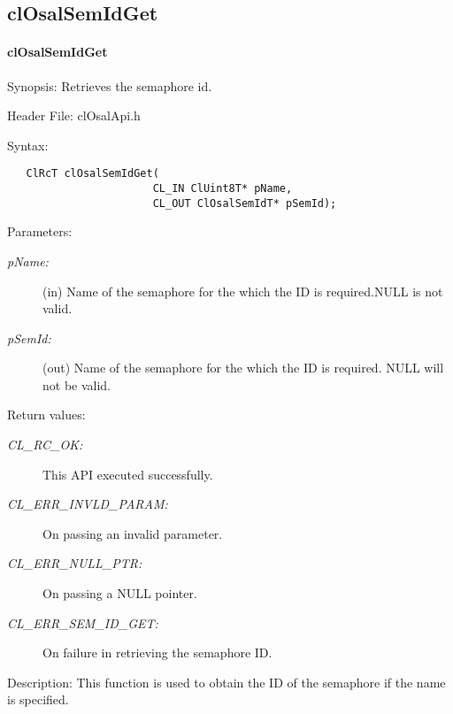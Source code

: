 \subsection{clOsalSemIdGet}
\hypertarget{pageosal133}{}\paragraph{cl\-Osal\-Sem\-Id\-Get}\label{pageosal133}
\begin{Desc}
\item[Synopsis:]Retrieves the semaphore id.\end{Desc}
\begin{Desc}
\item[Header File:]clOsalApi.h\end{Desc}
\begin{Desc}
\item[Syntax:]

\footnotesize\begin{verbatim}   ClRcT clOsalSemIdGet(
                       CL_IN ClUint8T* pName,
                       CL_OUT ClOsalSemIdT* pSemId);
\end{verbatim}
\normalsize
\end{Desc}
\begin{Desc}
\item[Parameters:]
\begin{description}
\item[{\em p\-Name:}](in) Name of the semaphore for the which the ID is required.NULL is not valid.\item[{\em p\-Sem\-Id:}](out) Name of the semaphore for the which the ID is required. NULL will not be valid.\end{description}
\end{Desc}
\begin{Desc}
\item[Return values:]
\begin{description}
\item[{\em CL\_\-RC\_\-OK:}]This API executed successfully. \item[{\em CL\_\-ERR\_\-INVLD\_\-PARAM:}]On passing an invalid parameter. \item[{\em CL\_\-ERR\_\-NULL\_\-PTR:}]On passing a NULL pointer. \item[{\em CL\_\-ERR\_\-SEM\_\-ID\_\-GET:}]On failure in retrieving the semaphore ID.\end{description}
\end{Desc}
\begin{Desc}
\item[Description:]This function is used to obtain the ID of the semaphore if the name is specified.\end{Desc}
